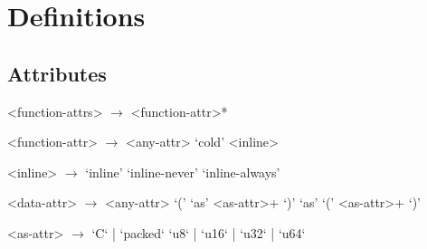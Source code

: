 \section{Definitions}\label{sec:def}

\subsection{Attributes}\label{sub:attr}
\begin{grammar}
<function-attrs> $\to$ \lit{\#(} <function-attr>* \lit{)}

<function-attr> $\to$ <any-attr>
                 \alt `cold'
                 \alt <inline>

<inline> $\to$ `inline'
          \alt `inline-never'
          \alt `inline-always'

<data-attr> $\to$ <any-attr>
            \alt `(' `as' <as-attr>+ `)'
            \alt `as' `(' <as-attr>+ `)'

<as-attr> $\to$ `C` | `packed`
          \alt `u8` | `u16` | `u32` | `u64`
\end{grammar}
